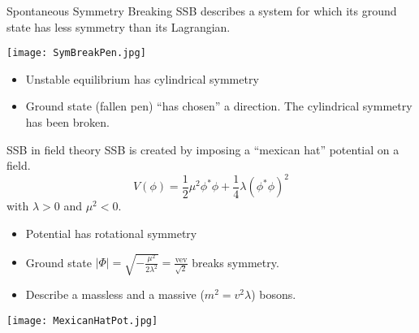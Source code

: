 

\begin{frame}{Spontaneous Symmetry Breaking}
  SSB describes a system for which its ground state has less symmetry than its Lagrangian.

  \texttt{[image: SymBreakPen.jpg]}
  \begin{itemize}
  \item Unstable equilibrium has cylindrical symmetry
  \item Ground state (fallen pen) ``has chosen'' a direction.
    The cylindrical symmetry has been broken.
  \end{itemize}
\end{frame}
\begin{frame}{SSB in field theory}
  SSB is created by imposing a ``mexican hat'' potential on a field.
  \begin{equation}
    \label{eq:orgdea495d}
    V(\phi) = \frac{1}{2}\mu^2\phi^*\phi+\frac{1}{4}\lambda(\phi^*\phi)^2
  \end{equation}
  with  $\lambda>0$ and $\mu^2 <0$.
  
  \begin{minipage}{0.49\linewidth}
  \begin{itemize}
  \item Potential has rotational symmetry
  \item Ground state $|\Phi|=\sqrt{-\frac{\mu^2}{2\lambda^2}}= \frac{\text{vev}}{\sqrt{2}}$ breaks symmetry.
  \item Describe a massless and a massive ($m^2=v^2\lambda$) bosons.
  \end{itemize}
  \end{minipage}
  \hfill
  \begin{minipage}{0.49\linewidth}
    \texttt{[image: MexicanHatPot.jpg]}
  \end{minipage}
\end{frame}
